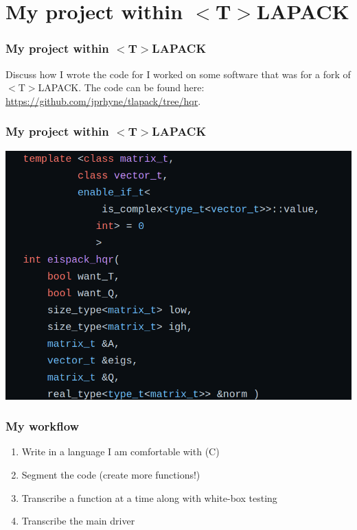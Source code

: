 \documentclass[12pt]{beamer}
\newcommand{\tla}{$<$T$>$LAPACK}
\begin{document}
    \section{My project within \tla}
    \begin{frame}
        \frametitle{My project within \tla}
        Discuss how I wrote the code for 
        I worked on some software that was for a fork of \tla. The code can be found here: 
        \url{https://github.com/jprhyne/tlapack/tree/hqr}.
    \end{frame}
    \begin{frame}
        \frametitle{My project within \tla}
        \includegraphics[width=\textwidth]{images/eispackHqr.png}
    \end{frame}
    \begin{frame}
        \frametitle{My workflow}
        \begin{enumerate}
            \item Write in a language I am comfortable with (C)
            \item Segment the code (create more functions!)
            \item Transcribe a function at a time along with white-box testing
            \item Transcribe the main driver
        \end{enumerate}
    \end{frame}
\end{document}
